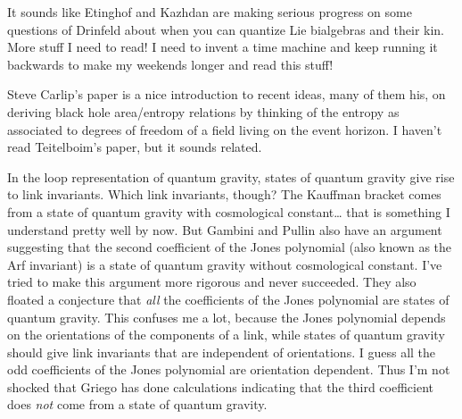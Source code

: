 \documentclass{article}
\renewcommand{\texttt}[1]{%
  \begingroup
  \ttfamily
  \begingroup\lccode`~=`/\lowercase{\endgroup\def~}{/\discretionary{}{}{}}%
  \begingroup\lccode`~=`[\lowercase{\endgroup\def~}{[\discretionary{}{}{}}%
  \begingroup\lccode`~=`.\lowercase{\endgroup\def~}{.\discretionary{}{}{}}%
  \catcode`/=\active\catcode`[=\active\catcode`.=\active
  \scantokens{#1\noexpand}%
  \endgroup
}
\begin{document}
It sounds like Etinghof and Kazhdan are making serious progress on some
questions of Drinfeld about when you can quantize Lie bialgebras and
their kin. More stuff I need to read! I need to invent a time machine
and keep running it backwards to make my weekends longer and read this
stuff!


Steve Carlip's paper is a nice introduction to recent ideas, many of
them his, on deriving black hole area/entropy relations by thinking of
the entropy as associated to degrees of freedom of a field living on the
event horizon. I haven't read Teitelboim's paper, but it sounds related.


In the loop representation of quantum gravity, states of quantum gravity
give rise to link invariants. Which link invariants, though? The
Kauffman bracket comes from a state of quantum gravity with cosmological
constant\ldots{} that is something I understand pretty well by now. But
Gambini and Pullin also have an argument suggesting that the second
coefficient of the Jones polynomial (also known as the Arf invariant) is
a state of quantum gravity without cosmological constant. I've tried to
make this argument more rigorous and never succeeded. They also floated
a conjecture that \emph{all} the coefficients of the Jones polynomial
are states of quantum gravity. This confuses me a lot, because the Jones
polynomial depends on the orientations of the components of a link,
while states of quantum gravity should give link invariants that are
independent of orientations. I guess all the odd coefficients of the
Jones polynomial are orientation dependent. Thus I'm not shocked that
Griego has done calculations indicating that the third coefficient does
\emph{not} come from a state of quantum gravity.
\end{document}
